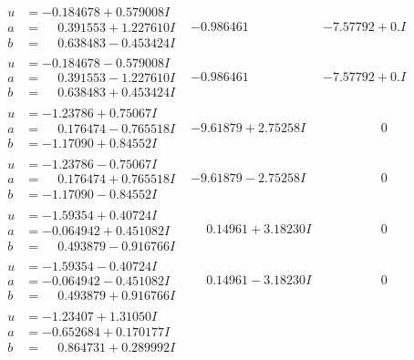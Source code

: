\documentclass[1p]{elsarticle_modified}
\theoremstyle{definition}
\begin{document}
$$\begin{array}{c|c|c}
\begin{aligned}
u &= -0.184678 + 0.579008 I \\
a &= \phantom{-}0.391553 + 1.227610 I \\
b &= \phantom{-}0.638483 - 0.453424 I\end{aligned}
 & -0.986461\phantom{ +0.000000I} & -7.57792 + 0. I\phantom{ +0.000000I} \\ \hline\begin{aligned}
u &= -0.184678 - 0.579008 I \\
a &= \phantom{-}0.391553 - 1.227610 I \\
b &= \phantom{-}0.638483 + 0.453424 I\end{aligned}
 & -0.986461\phantom{ +0.000000I} & -7.57792 + 0. I\phantom{ +0.000000I} \\ \hline\begin{aligned}
u &= -1.23786 + 0.75067 I \\
a &= \phantom{-}0.176474 - 0.765518 I \\
b &= -1.17090 + 0.84552 I\end{aligned}
 & -9.61879 + 2.75258 I & \phantom{-0.000000 } 0 \\ \hline\begin{aligned}
u &= -1.23786 - 0.75067 I \\
a &= \phantom{-}0.176474 + 0.765518 I \\
b &= -1.17090 - 0.84552 I\end{aligned}
 & -9.61879 - 2.75258 I & \phantom{-0.000000 } 0 \\ \hline\begin{aligned}
u &= -1.59354 + 0.40724 I \\
a &= -0.064942 + 0.451082 I \\
b &= \phantom{-}0.493879 - 0.916766 I\end{aligned}
 & \phantom{-}0.14961 + 3.18230 I & \phantom{-0.000000 } 0 \\ \hline\begin{aligned}
u &= -1.59354 - 0.40724 I \\
a &= -0.064942 - 0.451082 I \\
b &= \phantom{-}0.493879 + 0.916766 I\end{aligned}
 & \phantom{-}0.14961 - 3.18230 I & \phantom{-0.000000 } 0 \\ \hline\begin{aligned}
u &= -1.23407 + 1.31050 I \\
a &= -0.652684 + 0.170177 I \\
b &= \phantom{-}0.864731 + 0.289992 I\end{aligned}

\end{array}$$
\end{document}
